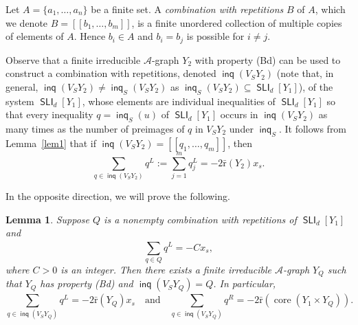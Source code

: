 \documentclass[10pt, reqno]{amsart}
\numberwithin{equation}{section}
\newtheorem{lem}[thm]{Lemma}
\begin{document}
Let $A = \{ a_1,  \dots, a_n \}$ be a finite set. A {\em combination with repetitions} $B$ of $A$, which we denote $B = [[ b_1, \dots, b_m ]]$, is a finite unordered collection of multiple copies of elements of $A$. Hence $b_i \in A$ and $b_i = b_j$ is possible for $i \ne j$.

Observe that a finite irreducible ${\mathcal{A}}$-graph $Y_2$ with  property (Bd)  can be used to construct a combination  with repetitions, denoted
$\operatorname{\textsf{inq}}(V_S Y_2)$ (note that, in general, $\operatorname{\textsf{inq}}(V_S Y_2) \ne \operatorname{\textsf{inq}}_S(V_S Y_2)$ as $\operatorname{\textsf{inq}}_S(V_S Y_2) \subseteq \operatorname{\textsf{SLI}}_d[Y_1]$),  of the system   $\operatorname{\textsf{SLI}}_d[Y_1]$, whose elements are individual inequalities of $\operatorname{\textsf{SLI}}_d[Y_1]$
so that every inequality $q = \operatorname{\textsf{inq}}_S(u)$ of  $\operatorname{\textsf{SLI}}_d[Y_1]$ occurs in $\operatorname{\textsf{inq}}(V_S Y_2)$ as many times as the number
of preimages of $q$ in $V_SY_2$ under $\operatorname{\textsf{inq}}_S$.  It follows from Lemma~\ref{lem1} that if $\operatorname{\textsf{inq}} (V_S  Y_2)  = [[ q_1, \dots, q_m ]]$, then
$$
\sum_{q \in  \operatorname{\textsf{inq}} (V_S  Y_2) }^{}q^L := \sum_{j=1}^{m}q_j^L = - 2 {\bar {\mathrm{r}}}(Y_2)  x_s  .
$$

In the opposite direction, we will prove the following.

\begin{lem}\label{lem2} Suppose $Q$ is a nonempty combination with repetitions of
$\operatorname{\textsf{SLI}}_d[Y_1]$  and
\begin{equation}\label{l2i11}
\sum_{q \in  Q}^{}q^L = -C x_s  ,
\end{equation}
where $C > 0 $ is an integer. Then there exists a  finite irreducible ${\mathcal{A}}$-graph $Y_Q$ such that $Y_Q$ has  property (Bd) and  $\operatorname{\textsf{inq}}(V_S Y_Q) =Q$. In particular,
\begin{equation}\label{l2i2}
\sum_{q \in  \operatorname{\textsf{inq}}( V_S Y_Q)}^{}q^L = - 2{\bar {\mathrm{r}}}(Y_Q) x_s \quad  \mbox{and}   \quad
\sum_{q \in  \operatorname{\textsf{inq}}(V_S Y_Q)}^{}q^R = - 2 {\bar {\mathrm{r}}}(\operatorname{core}(Y_1  \times  Y_Q))   .
\end{equation}
\end{lem}
\end{document}
